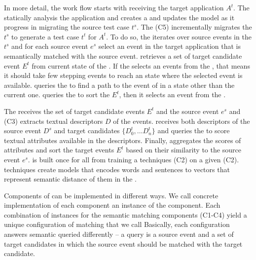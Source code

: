 \bigskip
In more detail, the \testreuse work flow starts with receiving the target application $A^t$.
The \generator statically analysis the application and creates a \tam and updates the model as it progress in migrating the source test case $t^s$.
The \selector (C5) incrementally migrates the $t^s$ to generate a test case $t^t$ for $A^t$.
To do so, the \selector iterates over source events in the $t^s$ and for each source event $e^s$ select an event in the target application that is semantically matched with the source event.
\selector retrieves a set of target candidate event $E^t$ from current state of the \tam. 
If the \selector selects an events from the \tam, that means it should take few stepping events to reach an state where the selected event is available. 
\selector queries the \tam to find a path to the event of in a state other than the current one. 
\selector queries the \matcher to  sort the $E^t$, then it selects an event from the . 


\bigskip
{}
The \matcher receives the set of target  candidate events $E^t$ and the source event $e^s$ and \ede (C3) extracts textual descriptors $D$ of the events. 
\sma receives both descriptors of the source event $D^s$ and target candidates $\{D_0^t, \dots D_n^t\}$ and queries the \wem to score textual attributes available in the descriptors. 
Finally, \sme aggregates the scores of attributes and sort the target events $E^t$ based on their similarity to the  source event $e^s$.
\wem is built once for all from training a \we techniques (C2) on a given \corpus (C2). 
\we techniques create models that encodes words and sentences to vectors that represent semantic distance of them in the \corpus.


\bigskip
Components of \testreuse can be implemented in different ways.
We call concrete implementation of each component an instance of the component.
Each combination of instances for the semantic matching components (C1-C4) yield a unique configuration of matching that we call \smconfig
Basically, each configuration answers semantic queried differently --  a query is a source event  and a set of target candidates in which the source event should be matched with the target candidate. 


